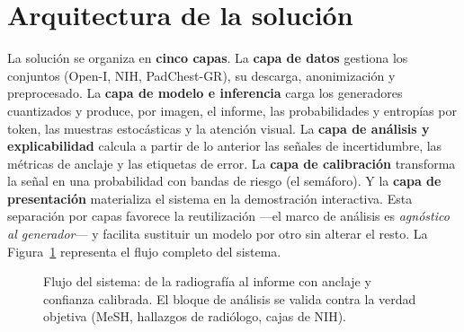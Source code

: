 \section{Arquitectura de la solución}
La solución se organiza en \textbf{cinco capas}. La \textbf{capa de datos} gestiona los conjuntos
(Open-I, NIH, PadChest-GR), su descarga, anonimización y preprocesado. La \textbf{capa de modelo e
inferencia} carga los generadores cuantizados y produce, por imagen, el informe, las probabilidades y
entropías por token, las muestras estocásticas y la atención visual. La \textbf{capa de análisis y
explicabilidad} calcula a partir de lo anterior las señales de incertidumbre, las métricas de anclaje
y las etiquetas de error. La \textbf{capa de calibración} transforma la señal en una probabilidad con
bandas de riesgo (el semáforo). Y la \textbf{capa de presentación} materializa el sistema en la
demostración interactiva. Esta separación por capas favorece la reutilización —el marco de análisis es
\emph{agnóstico al generador}— y facilita sustituir un modelo por otro sin alterar el resto. La
Figura~\ref{fig:pipeline} representa el flujo completo del sistema.

\begin{figure}[t]\centering
{}
\caption{Flujo del sistema: de la radiografía al informe con anclaje y confianza calibrada. El bloque
de análisis se valida contra la verdad objetiva (MeSH, hallazgos de radiólogo, cajas de NIH).}
\label{fig:pipeline}
\end{figure}

